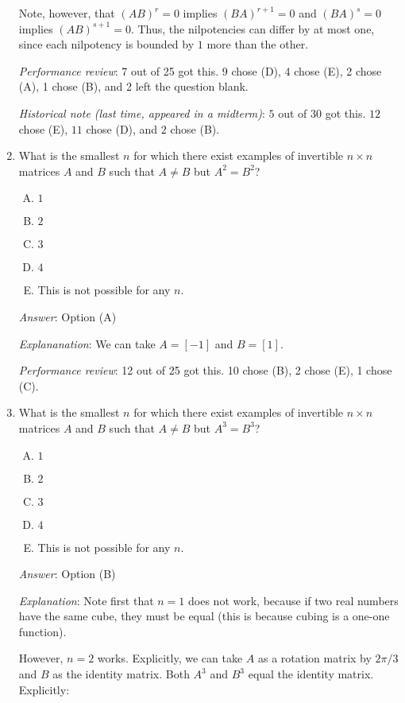 \documentclass[10pt]{amsart}
\begin{document}
\begin{enumerate}
  Note, however, that $(AB)^r = 0$ implies $(BA)^{r+1} = 0$ and
  $(BA)^s = 0$ implies $(AB)^{s+1} = 0$. Thus, the nilpotencies can
  differ by at most one, since each nilpotency is bounded by $1$ more
  than the other.
 
  {\em Performance review}: 7 out of 25 got this. 9 chose (D), 4 chose
  (E), 2 chose (A), 1 chose (B), and 2 left the question blank.

  {\em Historical note (last time, appeared in a midterm)}: $5$ out of
  $30$ got this. $12$ chose (E), $11$ chose (D), and $2$ chose (B).

\item What is the smallest $n$ for which there exist examples of
  invertible $n \times n$ matrices $A$ and $B$ such that $A \ne B$ but
  $A^2 = B^2$?

  \begin{enumerate}[(A)]
  \item $1$
  \item $2$
  \item $3$
  \item $4$
  \item This is not possible for any $n$.
  \end{enumerate}

  {\em Answer}: Option (A)

  {\em Explananation}: We can take $A = [-1]$ and $B = [1]$.

  {\em Performance review}: 12 out of 25 got this. 10 chose (B), 2
  chose (E), 1 chose (C).

\item What is the smallest $n$ for which there exist examples of
  invertible $n \times n$ matrices $A$ and $B$ such that $A \ne B$ but
  $A^3 = B^3$?

  \begin{enumerate}[(A)]
  \item $1$
  \item $2$
  \item $3$
  \item $4$
  \item This is not possible for any $n$.
  \end{enumerate}

  {\em Answer}: Option (B)

  {\em Explanation}: Note first that $n = 1$ does not work, because if
  two real numbers have the same cube, they must be equal (this is
  because cubing is a one-one function).

  However, $n = 2$ works. Explicitly, we can take $A$ as a rotation
  matrix by $2\pi/3$ and $B$ as the identity matrix. Both $A^3$ and
  $B^3$ equal the identity matrix. Explicitly:


\end{enumerate}
\end{document}
